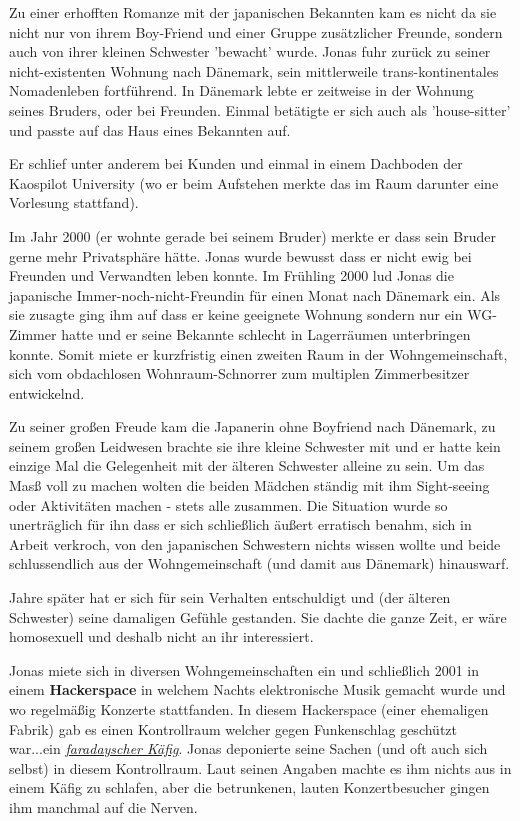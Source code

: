 Zu einer erhofften Romanze mit der japanischen Bekannten kam es nicht da sie nicht nur von ihrem Boy-Friend und einer Gruppe zusätzlicher Freunde, sondern auch von ihrer kleinen Schwester 'bewacht' wurde. Jonas fuhr zurück zu seiner nicht-existenten Wohnung nach Dänemark, sein mittlerweile trans-kontinentales Nomadenleben fortführend. In Dänemark lebte er zeitweise in der Wohnung seines Bruders, oder bei Freunden. Einmal betätigte er sich auch als 'house-sitter' und passte auf das Haus eines Bekannten auf. 

Er schlief unter anderem bei Kunden und einmal in einem Dachboden der Kaospilot University (wo er beim Aufstehen merkte das im Raum darunter eine Vorlesung stattfand).


Im Jahr 2000 (er wohnte gerade bei seinem Bruder) merkte er dass sein Bruder gerne mehr Privatsphäre hätte. Jonas wurde bewusst dass er nicht ewig bei Freunden und Verwandten leben konnte. Im Frühling 2000 lud Jonas die japanische Immer-noch-nicht-Freundin für einen Monat nach Dänemark ein. Als sie zusagte ging ihm auf dass er keine geeignete Wohnung sondern nur ein WG-Zimmer hatte und er seine Bekannte schlecht in Lagerräumen unterbringen konnte. Somit miete er kurzfristig einen zweiten Raum in der Wohngemeinschaft, sich vom obdachlosen Wohnraum-Schnorrer zum multiplen Zimmerbesitzer entwickelnd.

Zu seiner großen Freude kam die Japanerin ohne Boyfriend nach Dänemark, zu seinem großen Leidwesen brachte sie ihre kleine Schwester mit und er hatte kein einzige Mal die Gelegenheit mit der älteren Schwester alleine zu sein. Um das Masß voll zu machen wolten die beiden Mädchen ständig mit ihm Sight-seeing oder Aktivitäten machen  - stets alle zusammen. Die Situation wurde so unerträglich für ihn dass er sich schließlich äußert erratisch benahm, sich in Arbeit verkroch, von den japanischen Schwestern nichts wissen wollte und beide schlussendlich aus der Wohngemeinschaft (und damit aus Dänemark) hinauswarf.

Jahre später hat er sich für sein Verhalten entschuldigt und (der älteren Schwester) seine damaligen Gefühle gestanden. Sie dachte die ganze Zeit, er wäre homosexuell und deshalb nicht an ihr interessiert. 

Jonas miete sich in diversen Wohngemeinschaften ein und schließlich 2001 in einem \textbf{Hackerspace} in welchem Nachts elektronische Musik gemacht wurde und wo regelmäßig Konzerte stattfanden. In diesem Hackerspace (einer ehemaligen Fabrik) gab es einen Kontrollraum welcher gegen Funkenschlag geschützt war...ein \href{http://goo.gl/wfPa4p}{\textit{faradayscher Käfig}}. Jonas deponierte seine Sachen (und oft auch sich selbst) in diesem Kontrollraum. Laut seinen Angaben machte es ihm nichts aus in einem Käfig zu schlafen, aber die betrunkenen, lauten Konzertbesucher gingen ihm manchmal auf die Nerven.

